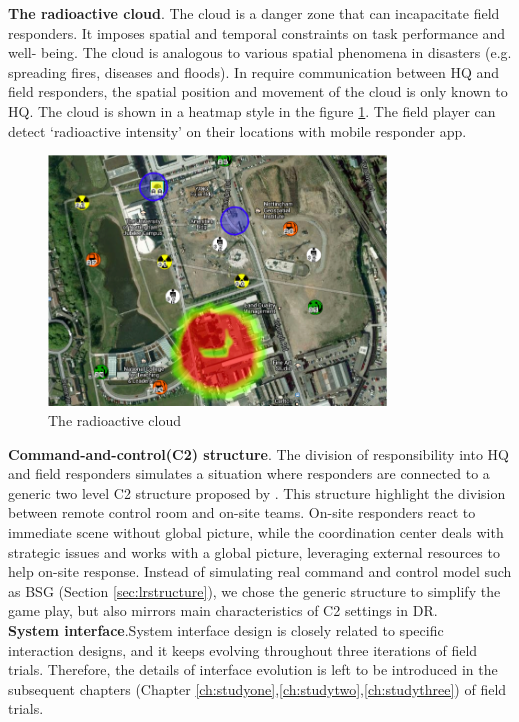 \textbf{The radioactive cloud}. The cloud is a danger zone that can incapacitate field responders. It imposes spatial and temporal constraints on task performance and well- being. The cloud is analogous to various spatial phenomena in disasters (e.g. spreading fires, diseases and floods). In require communication between HQ and field responders, the spatial position and movement of the cloud is only known to HQ. The cloud is shown in a heatmap style in the figure \ref{fig:cloud}. The field player can detect `radioactive intensity' on their locations with mobile responder app.\\

\begin{figure}[h]
  \centering
  \includegraphics[width=0.8\textwidth]{img/approach/radioactiveCloud}
  \caption{The radioactive cloud}
  \label{fig:cloud}
\end{figure}

\textbf{Command-and-control(C2) structure}. The division of responsibility into HQ and field responders simulates a situation where  responders are connected to a generic two level \ac{C2} structure proposed by \cite{Chen2005}. This structure highlight the division between remote control room and on-site teams.  On-site responders react to immediate scene without global picture, while the coordination center deals with strategic issues and works with a global picture, leveraging external resources to help on-site response. Instead of simulating real command and control model such as \ac{BSG} (Section \ref{sec:lrstructure}), we chose the generic structure to simplify the game play, but also mirrors main characteristics of \ac{C2} settings in DR. \\

\textbf{System interface}.System interface design is closely related to specific interaction designs, and it keeps evolving throughout three iterations of field trials. Therefore, the details of interface evolution is left to be introduced in the subsequent chapters (Chapter \ref{ch:studyone},\ref{ch:studytwo},\ref{ch:studythree}) of field trials. \\



